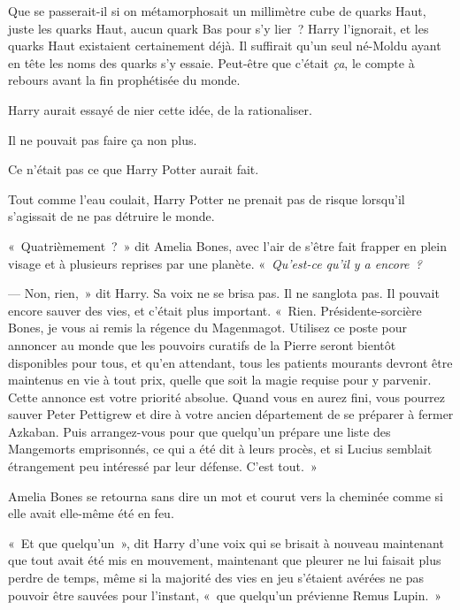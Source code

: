 Que se passerait-il si on métamorphosait un millimètre cube de quarks Haut, juste les quarks Haut, aucun quark Bas pour s'y lier~?
Harry l'ignorait, et les quarks Haut existaient certainement déjà.
Il suffirait qu'un seul né-Moldu ayant en tête les noms des quarks s'y essaie.
Peut-être que c'était \emph{ça}, le compte à rebours avant la fin prophétisée du monde.

Harry aurait essayé de nier cette idée, de la rationaliser.

Il ne pouvait pas faire ça non plus.

Ce n'était pas ce que Harry Potter aurait fait.

Tout comme l'eau coulait, Harry Potter ne prenait pas de risque lorsqu'il s'agissait de ne pas détruire le monde.

«~Quatrièmement~?~»
dit Amelia Bones, avec l'air de s'être fait frapper en plein visage et à plusieurs reprises par une planète.
«~\emph{Qu'est-ce qu'il y a encore~?}

--- Non, rien,~» dit Harry.
Sa voix ne se brisa pas.
Il ne sanglota pas.
Il pouvait encore sauver des vies, et c'était plus important.
«~Rien. Présidente-sorcière Bones, je vous ai remis la régence du Magenmagot.
Utilisez ce poste pour annoncer au monde que les pouvoirs curatifs de la Pierre seront bientôt disponibles pour tous, et qu'en attendant, tous les patients mourants devront être maintenus en vie à tout prix, quelle que soit la magie requise pour y parvenir.
Cette annonce est votre priorité absolue.
Quand vous en aurez fini, vous pourrez sauver Peter Pettigrew et dire à votre ancien département de se préparer à fermer Azkaban.
Puis arrangez-vous pour que quelqu'un prépare une liste des Mangemorts emprisonnés, ce qui a été dit à leurs procès, et si Lucius semblait étrangement peu intéressé par leur défense.
C'est tout.~»

Amelia Bones se retourna sans dire un mot et courut vers la cheminée comme si elle avait elle-même été en feu.

«~Et que quelqu'un~», dit Harry d'une voix qui se brisait à nouveau maintenant que tout avait été mis en mouvement, maintenant que pleurer ne lui faisait plus perdre de temps, même si la majorité des vies en jeu s'étaient avérées ne pas pouvoir être sauvées pour l'instant, «~que quelqu'un prévienne Remus Lupin.~»
